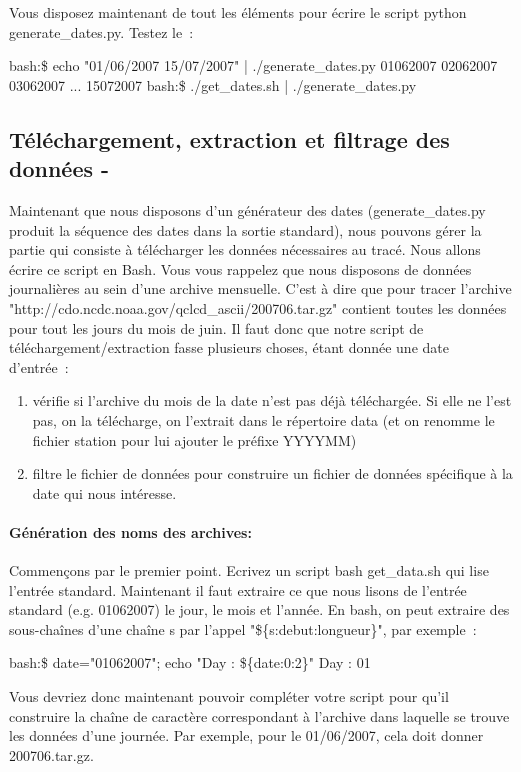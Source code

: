 Vous disposez maintenant de tout les éléments pour écrire le script python generate\_dates.py. Testez le~:
\begin{exempleResultat}
bash:\$ echo "01/06/2007 15/07/2007" | ./generate\_dates.py 
01062007
02062007
03062007
...
15072007
bash:\$ ./get\_dates.sh | ./generate\_dates.py 
\end{exempleResultat}

\subsection{Téléchargement, extraction et filtrage des données - \tar \wget \grep \awk \sed}

Maintenant que nous disposons d'un générateur des dates (generate\_dates.py produit la séquence des dates dans la sortie standard), nous pouvons gérer la partie qui consiste à télécharger les données nécessaires au tracé. Nous allons écrire ce script en Bash. Vous vous rappelez que nous disposons de données journalières au sein d'une archive mensuelle. C'est à dire que pour tracer l'archive "http://cdo.ncdc.noaa.gov/qclcd\_ascii/200706.tar.gz" contient toutes les données pour tout les jours du mois de juin. Il faut donc que notre script de téléchargement/extraction fasse plusieurs choses, étant donnée une date d'entrée~:
\begin{enumerate}
\item vérifie si l'archive du mois de la date n'est pas déjà téléchargée. Si elle ne l'est pas, on la télécharge, on l'extrait dans le répertoire data (et on renomme le fichier station pour lui ajouter le préfixe YYYYMM)
\item filtre le fichier de données pour construire un fichier de données spécifique à la date qui nous intéresse.
\end{enumerate}


\paragraph{Génération des noms des archives:}
Commençons par le premier point. Ecrivez un script bash get\_data.sh qui lise l'entrée standard. Maintenant il faut extraire ce que nous lisons de l'entrée standard (e.g. 01062007) le jour, le mois et l'année. En bash, on peut extraire des sous-chaînes d'une chaîne s par l'appel "\$\{s:debut:longueur\}", par exemple~:
\begin{exempleResultat}
bash:\$ date="01062007"; echo "Day : \$\{date:0:2\}"
Day : 01
\end{exempleResultat}
Vous devriez donc maintenant pouvoir compléter votre script pour qu'il construire la chaîne de caractère correspondant à l'archive dans laquelle se trouve les données d'une journée. Par exemple, pour le 01/06/2007, cela doit donner 200706.tar.gz.\\

